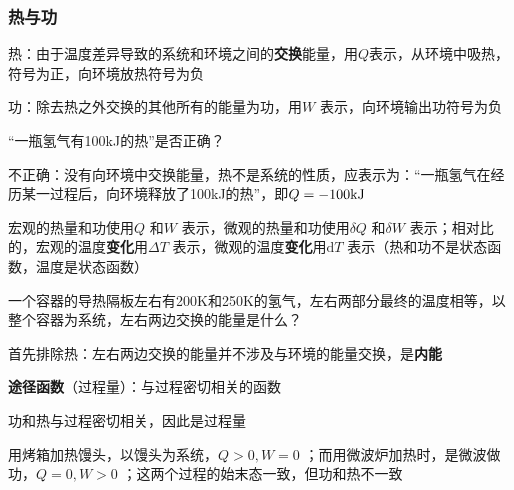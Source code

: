 \subsubsection*{热与功}%
\label{subsub*:热与功}
\begin{defi}
热：由于温度差异导致的系统和环境之间的\textbf{交换}能量，用$Q$表示，从环境中吸热，符号为正，向环境放热符号为负

功：除去热之外交换的其他所有的能量为功，用$W$ 表示，向环境输出功符号为负
\end{defi}
\begin{question}
    “一瓶氢气有100kJ的热”是否正确？
\end{question}
\begin{sol}
    不正确：没有向环境中交换能量，热不是系统的性质，应表示为：“一瓶氢气在经历某一过程后，向环境释放了100kJ的热”，即$Q=-100\ce{kJ}$
\end{sol}
宏观的热量和功使用$Q$ 和$W$ 表示，微观的热量和功使用$\delta Q$ 和$\delta W$ 表示；相对比的，宏观的温度\textbf{变化}用$\Delta T$ 表示，微观的温度\textbf{变化}用$\mathrm{d}T$ 表示（热和功不是状态函数，温度是状态函数）
\begin{question}
    一个容器的导热隔板左右有200K和250K的氢气，左右两部分最终的温度相等，以整个容器为系统，左右两边交换的能量是什么？
\end{question}
\begin{sol}
    首先排除热：左右两边交换的能量并不涉及与环境的能量交换，是\textbf{内能}
\end{sol}
\begin{defi}
    \textbf{途径函数}（过程量）：与过程密切相关的函数
\end{defi}
功和热与过程密切相关，因此是过程量
\begin{eg}
    用烤箱加热馒头，以馒头为系统，$Q>0,W=0$ ；而用微波炉加热时，是微波做功，$Q=0,W>0$ ；这两个过程的始末态一致，但功和热不一致
\end{eg}
